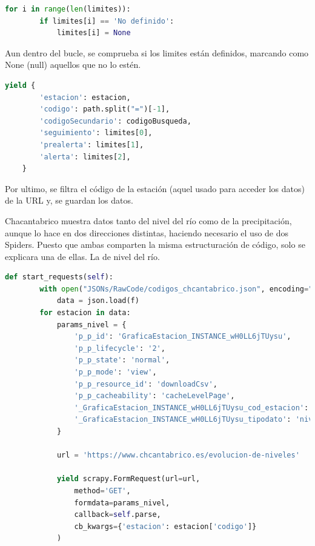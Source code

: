 \begin{lstlisting}[language=Python, caption={Combrobar limites de Chcantabrico Code Spider}]
	for i in range(len(limites)):
		if limites[i] == 'No definido':
			limites[i] = None
\end{lstlisting}

Aun dentro del bucle, se comprueba si los limites están definidos, marcando como None (null) aquellos que no lo estén.

\begin{lstlisting}[language=Python, caption={Guardado de datos de Chcantabrico Code Spider}]
	yield {
		'estacion': estacion,
		'codigo': path.split("=")[-1],
		'codigoSecundario': codigoBusqueda,
		'seguimiento': limites[0],
		'prealerta': limites[1],
		'alerta': limites[2],
	}
\end{lstlisting}

Por ultimo, se filtra el código de la estación (aquel usado para acceder los datos) de la URL y, se guardan los datos.

Chacantabrico muestra datos tanto del nivel del río como de la precipitación, aunque lo hace en dos direcciones distintas, haciendo necesario el uso de dos Spiders.\newline
\newline
Puesto que ambas comparten la misma estructuración de código, solo se explicara una de ellas. La de nivel del río.

\begin{lstlisting}[language=Python, caption={start\_requests() Chcantabrico Nivel Spider}]
	def start_requests(self):
		with open("JSONs/RawCode/codigos_chcantabrico.json", encoding="utf-8") as f:
			data = json.load(f)
		for estacion in data:
			params_nivel = {
				'p_p_id': 'GraficaEstacion_INSTANCE_wH0LL6jTUysu',
				'p_p_lifecycle': '2',
				'p_p_state': 'normal',
				'p_p_mode': 'view',
				'p_p_resource_id': 'downloadCsv',
				'p_p_cacheability': 'cacheLevelPage',
				'_GraficaEstacion_INSTANCE_wH0LL6jTUysu_cod_estacion': f'{estacion["codigo"]}',
				'_GraficaEstacion_INSTANCE_wH0LL6jTUysu_tipodato': 'nivel',
			}
		
			url = 'https://www.chcantabrico.es/evolucion-de-niveles'
			
			yield scrapy.FormRequest(url=url,
				method='GET',
				formdata=params_nivel,
				callback=self.parse,
				cb_kwargs={'estacion': estacion['codigo']}
			)
\end{lstlisting}


